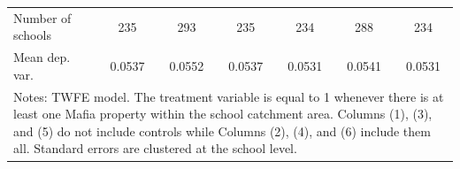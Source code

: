 \documentclass[12pt]{article}
\theoremstyle{plain}
\theoremstyle{plain}
\theoremstyle{plain}
\theoremstyle{definition}
\theoremstyle{plain}
\theoremstyle{definition}
\theoremstyle{plain}
\theoremstyle{remark}
\theoremstyle{definition}
\theoremstyle{definition}
\theoremstyle{plain}
\begin{document}
\begin{table}[H]
{\begin{tabular}{p{4.055em}llllll}
			\multicolumn{1}{l}{Number of schools} & \multicolumn{1}{c}{235} & \multicolumn{1}{c}{293} & \multicolumn{1}{c}{235} & \multicolumn{1}{c}{234} & \multicolumn{1}{c}{288} & \multicolumn{1}{c}{234} \\
			\multicolumn{1}{l}{Mean dep. var.} & \multicolumn{1}{c}{0.0537} & \multicolumn{1}{c}{0.0552} & \multicolumn{1}{c}{0.0537} & \multicolumn{1}{c}{0.0531} & \multicolumn{1}{c}{0.0541} & \multicolumn{1}{c}{0.0531} \\
			\midrule
			\multicolumn{7}{p{43.385em}}{Notes: TWFE model. The treatment variable is equal to 1 whenever there is at least one Mafia property within the school catchment area. Columns (1), (3), and (5) do not include controls while Columns (2), (4), and (6) include them all. Standard errors are clustered at the school level.} \\
		\end{tabular}%
	}
\end{table}
\FloatBarrier
\end{document}

